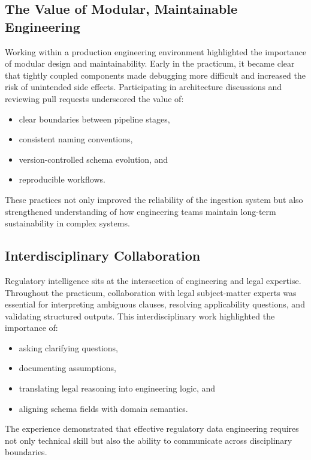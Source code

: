 \documentclass[sigconf]{acmart}
\begin{document}
\subsection{The Value of Modular, Maintainable Engineering}

Working within a production engineering environment highlighted the importance of modular design and maintainability. Early in the practicum, it became clear that tightly coupled components made debugging more difficult and increased the risk of unintended side effects. Participating in architecture discussions and reviewing pull requests underscored the value of:

\begin{itemize}
    \item clear boundaries between pipeline stages,
    \item consistent naming conventions,
    \item version-controlled schema evolution, and
    \item reproducible workflows.
\end{itemize}

These practices not only improved the reliability of the ingestion system but also strengthened understanding of how engineering teams maintain long-term sustainability in complex systems.

\subsection{Interdisciplinary Collaboration}

Regulatory intelligence sits at the intersection of engineering and legal expertise. Throughout the practicum, collaboration with legal subject-matter experts was essential for interpreting ambiguous clauses, resolving applicability questions, and validating structured outputs. This interdisciplinary work highlighted the importance of:

\begin{itemize}
    \item asking clarifying questions,
    \item documenting assumptions,
    \item translating legal reasoning into engineering logic, and
    \item aligning schema fields with domain semantics.
\end{itemize}

The experience demonstrated that effective regulatory data engineering requires not only technical skill but also the ability to communicate across disciplinary boundaries.
\end{document}
